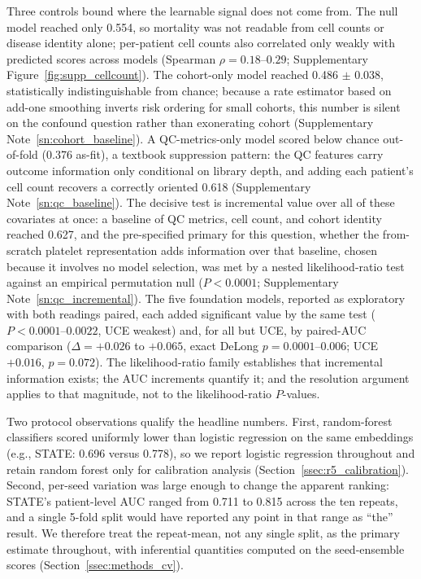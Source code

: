 \documentclass[11pt,a4paper]{article}
\newcommand{\model}[1]{\textsc{#1}}
\begin{document}
Three controls bound where the learnable signal does not come from. The null
model reached only 0.554, so mortality was not readable from cell counts or
disease identity alone; per-patient cell counts also correlated only weakly
with predicted scores across models (Spearman $\rho = 0.18$--$0.29$;
Supplementary Figure~\ref{fig:supp_cellcount}). The cohort-only model reached
0.486 $\pm$ 0.038, statistically indistinguishable from chance; because a
rate estimator based on add-one smoothing inverts risk ordering for small
cohorts, this number is silent on the confound question rather than
exonerating cohort (Supplementary Note~\ref{sn:cohort_baseline}). A
QC-metrics-only model scored below chance out-of-fold (0.376 as-fit), a
textbook suppression pattern: the QC features carry outcome information only
conditional on library depth, and adding each patient's cell count recovers a
correctly oriented 0.618 (Supplementary Note~\ref{sn:qc_baseline}). The
decisive test is incremental value over all of these covariates at once:
a baseline of QC metrics, cell count, and cohort identity reached 0.627, and
the pre-specified primary for this question, whether the from-scratch
platelet representation adds information over that baseline, chosen because
it involves no model selection, was met by a nested likelihood-ratio test
against an empirical permutation null ($P < 0.0001$;
Supplementary Note~\ref{sn:qc_incremental}). The five foundation models,
reported as exploratory with both readings paired, each added significant
value by the same test ($P < 0.0001$--$0.0022$, \model{UCE} weakest) and, for
all but \model{UCE}, by paired-AUC comparison ($\Delta = +0.026$ to $+0.065$,
exact DeLong $p = 0.0001$--$0.006$; \model{UCE} $+0.016$, $p = 0.072$). The
likelihood-ratio family establishes that incremental information exists; the
AUC increments quantify it; and the resolution argument applies to that
magnitude, not to the likelihood-ratio $P$-values.

Two protocol observations qualify the headline numbers. First, random-forest
classifiers scored uniformly lower than logistic regression on the same
embeddings (e.g., \model{STATE}: 0.696 versus 0.778), so we report logistic
regression throughout and retain random forest only for calibration analysis
(Section~\ref{ssec:r5_calibration}). Second, per-seed variation was large enough
to change the apparent ranking: \model{STATE}'s patient-level AUC ranged from
0.711 to 0.815 across the ten repeats, and a single 5-fold split would have
reported any point in that range as ``the'' result. We therefore treat the
repeat-mean, not any single split, as the primary estimate throughout, with
inferential quantities computed on the seed-ensemble scores
(Section~\ref{ssec:methods_cv}).
\end{document}
